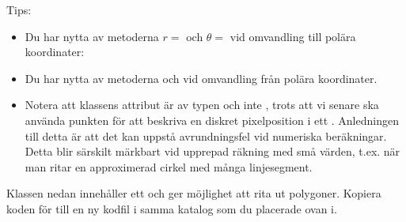 \noindent Tips:
\begin{itemize}
\item Du har nytta av metoderna $r = $  och $\theta = $  vid omvandling till polära koordinater:


\item Du har nytta av metoderna  och  vid omvandling från polära koordinater.

\item Notera att klassens attribut är av typen  och inte , trots att vi senare ska använda punkten för att beskriva en diskret pixelposition i ett . Anledningen till detta är att det kan uppstå avrundningsfel vid numeriska beräkningar. Detta blir särskilt märkbart vid upprepad räkning med små värden, t.ex. när man ritar en approximerad cirkel med många linjesegment.
\end{itemize}

\Subtask Klassen  nedan innehåller ett  och ger möjlighet att rita ut polygoner. 
Kopiera koden för  till en ny kodfil  i samma katalog som du placerade  ovan i.

